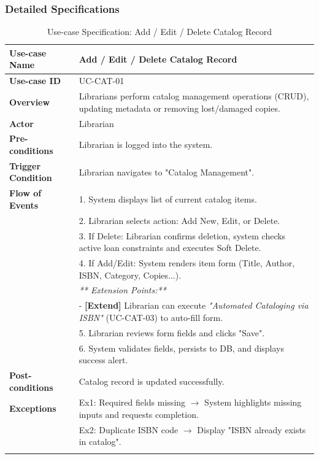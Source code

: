 \subsubsection{Detailed Specifications}

\begin{longtable}{|p{3.5cm}|p{11.5cm}|}
    \hline
    \textbf{Use-case Name} & \textbf{Add / Edit / Delete Catalog Record} \\
    \hline
    \textbf{Use-case ID} & UC-CAT-01 \\
    \hline
    \textbf{Overview} & Librarians perform catalog management operations (CRUD), updating metadata or removing lost/damaged copies. \\
    \hline
    \textbf{Actor} & Librarian \\
    \hline
    \textbf{Pre-conditions} & Librarian is logged into the system. \\
    \hline
    \textbf{Trigger Condition} & Librarian navigates to "Catalog Management". \\
    \hline
    \textbf{Flow of Events} & 
    1. System displays list of current catalog items.\\ 
 & 
    2. Librarian selects action: Add New, Edit, or Delete.\\ 
 & 
    3. If Delete: Librarian confirms deletion, system checks active loan constraints and executes Soft Delete.\\ 
 & 
    4. If Add/Edit: System renders item form (Title, Author, ISBN, Category, Copies...).\\ 
 & 
    \textit{** Extension Points:**}\\ 
 & 
    - \textbf{[Extend]} Librarian can execute \textit{"Automated Cataloging via ISBN"} (UC-CAT-03) to auto-fill form.\\ 
 & 

    5. Librarian reviews form fields and clicks "Save".\\ 
 & 
    6. System validates fields, persists to DB, and displays success alert. \\
    \hline
    \textbf{Post-conditions} & Catalog record is updated successfully. \\
    \hline
    \textbf{Exceptions} & 
    Ex1: Required fields missing $\rightarrow$ System highlights missing inputs and requests completion.\\ 
 & 
    Ex2: Duplicate ISBN code $\rightarrow$ Display "ISBN already exists in catalog". \\
    \hline
    \caption{Use-case Specification: Add / Edit / Delete Catalog Record} \\
\end{longtable}

